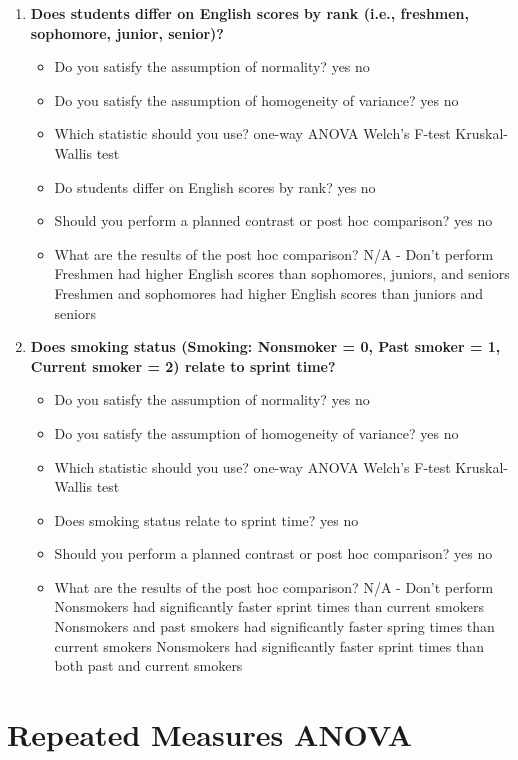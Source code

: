\documentclass[
]{book}
\begin{document}
\begin{enumerate}
\def\labelenumi{\arabic{enumi}.}
\item
  \textbf{Does students differ on English scores by rank (i.e., freshmen, sophomore, junior, senior)?}

  \begin{itemize}
  \item
    Do you satisfy the assumption of normality? yes no
  \item
    Do you satisfy the assumption of homogeneity of variance? yes no
  \item
    Which statistic should you use? one-way ANOVA Welch's F-test Kruskal-Wallis test
  \item
    Do students differ on English scores by rank? yes no
  \item
    Should you perform a planned contrast or post hoc comparison? yes no
  \item
    What are the results of the post hoc comparison? N/A - Don't perform Freshmen had higher English scores than sophomores, juniors, and seniors Freshmen and sophomores had higher English scores than juniors and seniors
  \end{itemize}
\item
  \textbf{Does smoking status (Smoking: Nonsmoker = 0, Past smoker = 1, Current smoker = 2) relate to sprint time?}

  \begin{itemize}
  \item
    Do you satisfy the assumption of normality? yes no
  \item
    Do you satisfy the assumption of homogeneity of variance? yes no
  \item
    Which statistic should you use? one-way ANOVA Welch's F-test Kruskal-Wallis test
  \item
    Does smoking status relate to sprint time? yes no
  \item
    Should you perform a planned contrast or post hoc comparison? yes no
  \item
    What are the results of the post hoc comparison? N/A - Don't perform Nonsmokers had significantly faster sprint times than current smokers Nonsmokers and past smokers had significantly faster spring times than current smokers Nonsmokers had significantly faster sprint times than both past and current smokers
  \end{itemize}
\end{enumerate}

\hypertarget{repeated-measures-anova}{%
\chapter{Repeated Measures ANOVA}\label{repeated-measures-anova}}
\end{document}

